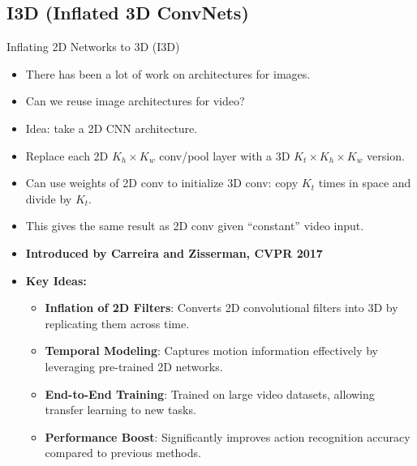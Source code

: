 \subsection{I3D (Inflated 3D ConvNets)}
\begin{frame}[allowframebreaks]{Inflating 2D Networks to 3D (I3D)}
    \begin{itemize}
        \item There has been a lot of work on architectures for images.
        \item Can we reuse image architectures for video?
        \item Idea: take a 2D CNN architecture.
        \item Replace each 2D $K_h \times K_w$ conv/pool layer with a 3D $K_t \times K_h \times K_w$ version.
        \item Can use weights of 2D conv to initialize 3D conv: copy $K_t$ times in space and divide by $K_t$.
        \item This gives the same result as 2D conv given ``constant'' video input.
    \end{itemize}
\framebreak
    \begin{itemize}
        \item \textbf{Introduced by Carreira and Zisserman, CVPR 2017} \\
        \item \textbf{Key Ideas:}
        \begin{itemize}
            \item \textbf{Inflation of 2D Filters}: Converts 2D convolutional filters into 3D by replicating them across time.
            \item \textbf{Temporal Modeling}: Captures motion information effectively by leveraging pre-trained 2D networks.
            \item \textbf{End-to-End Training}: Trained on large video datasets, allowing transfer learning to new tasks.
            \item \textbf{Performance Boost}: Significantly improves action recognition accuracy compared to previous methods.
        \end{itemize}
    \end{itemize}
\framebreak
    \begin{figure}
        \centering

\end{figure}
\end{frame}
